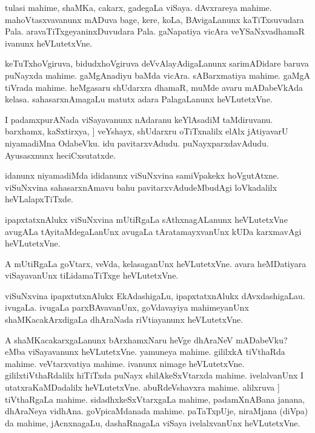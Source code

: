 \documentclass{article}
\begin{document}
\begin{mn}%
tulasi mahime, shaMKa, cakarx, gadegaLa viSaya. dAvxrareya mahime. mahoVtasxvavanunx mADuva 
bage, kere, koLa, BAvigaLanunx kaTiTxsuvudara Pala. aravaTiTxgeyaninxDuvudara Pala. 
gaNapatiya vicAra veYSaNxvadhamaR ivanunx heVLutetxVne.
\end{mn}

\begin{mn}%
keTuTxhoVgiruva, bidudxhoVgiruva deVvAlayAdigaLanunx sarimADidare baruva puNayxda mahime. 
gaMgAnadiyu baMda vicAra. sABarxmatiya mahime. gaMgA tiVrada mahime. heMgasaru shUdarxra 
dhamaR, muMde avaru mADabeVkAda kelasa. sahasarxnAmagaLu matutx adara PalagaLanunx 
heVLutetxVne.
\end{mn}

\begin{mn}%
I padamxpurANada viSayavanunx nAdaranu keYlAsadiM  taMdiruvanu. barxhamx, kaSxtirxya, ]
veYshayx, shUdarxru oTiTxnalilx elAlx jAtiyavarU niyamadiMna OdabeVku. idu pavitarxvAdudu. 
puNayxparxdavAdudu. Ayusasxnunx heciCxsutatxde.
\end{mn}

\begin{mn}%
idanunx niyamadiMda ididanunx viSuNxvina samiVpakekx hoVgutAtxne. viSuNxvina sahasarxnAmavu 
bahu pavitarxvAdudeMbudAgi loVkadalilx heVLalapxTiTxde.
\end{mn}

\begin{mn}%
ipapxtatxnAlukx viSuNxvina mUtiRgaLa sAthxnagALanunx heVLutetxVne avugALa tAyitaMdegaLanUnx 
avugaLa tAratamayxvanUnx kUDa karxmavAgi heVLutetxVne.
\end{mn}

\begin{mn}%
A mUtiRgaLa goVtarx, veVda, kelasaganUnx heVLutetxVne. avara heMDatiyara viSayavanUnx 
tiLidamaTiTxge heVLutetxVne.
\end{mn}

\begin{mn}%
viSuNxvina ipapxtutxnAlukx EkAdashigaLu, ipapxtatxnAlukx dAvxdashigaLau. ivugaLa. ivugaLa 
parxBAvavanUnx, goVdavayiya mahimeyanUnx shaMKacakArxdigaLa dhAraNada riVtiayanunx 
heVLutetxVne.
\end{mn}

\begin{mn}%
A shaMKacakarxgaLanunx bArxhamxNaru heVge dhAraNeV mADabeVku? eMba viSayavanunx 
heVLutetxVne. yamuneya mahime. gililxkA tiVthaRda mahime. veVtarxvatiya mahime. ivanunx 
nimage heVLutetxVne. gililxtiVthaRdalilx hiTiTxda puNayx shilAkeSxVtarxda mahime. 
ivelalvanUnx I utatxraKaMDadalilx heVLutetxVne. abuRdeVshavxra mahime. alilxruva ]
tiVthaRgaLa mahime. sidadhxkeSxVtarxgaLa mahime, padamXnABana janana, dhAraNeya vidhAna. 
goVpicaMdanada mahime. paTaTxpUje, niraMjana (diVpa) da mahime, jAcnxnagaLu, dashaRnagaLa 
viSaya ivelalxvanUnx heVLutetxVne.
\end{mn}
\end{document}
